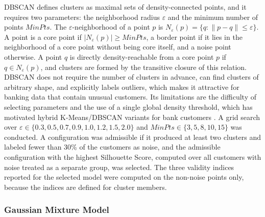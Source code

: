 \documentclass[conference]{IEEEtran}
\begin{document}
DBSCAN \cite{ester1996density} defines clusters as maximal sets of density-connected points, and it requires two parameters: the neighborhood radius $\varepsilon$ and the minimum number of points $MinPts$. The $\varepsilon$-neighborhood of a point $p$ is $N_\varepsilon(p)=\{q : \|p-q\|\le\varepsilon\}$. A point is a core point if $|N_\varepsilon(p)|\ge MinPts$, a border point if it lies in the neighborhood of a core point without being core itself, and a noise point otherwise. A point $q$ is directly density-reachable from a core point $p$ if $q\in N_\varepsilon(p)$, and clusters are formed by the transitive closure of this relation. DBSCAN does not require the number of clusters in advance, can find clusters of arbitrary shape, and explicitly labels outliers, which makes it attractive for banking data that contain unusual customers. Its limitations are the difficulty of selecting parameters and the use of a single global density threshold, which has motivated hybrid K-Means/DBSCAN variants for bank customers \cite{yan2025}. A grid search over $\varepsilon \in \{0.3, 0.5, 0.7, 0.9, 1.0, 1.2, 1.5, 2.0\}$ and $MinPts \in \{3, 5, 8, 10, 15\}$ was conducted. A configuration was admissible if it produced at least two clusters and labeled fewer than 30\% of the customers as noise, and the admissible configuration with the highest Silhouette Score, computed over all customers with noise treated as a separate group, was selected. The three validity indices reported for the selected model were computed on the non-noise points only, because the indices are defined for cluster members.

\subsubsection{Gaussian Mixture Model}
\end{document}
